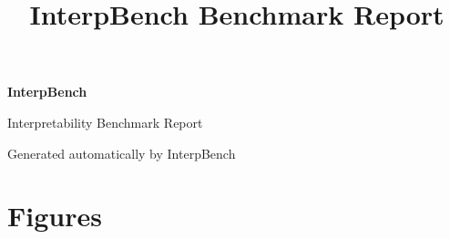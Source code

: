 \documentclass[11pt,a4paper]{article}
\title{
    \vspace{-2cm}
    \textbf{InterpBench Benchmark Report}
}
\author{}
\date{}
\begin{document}

\begin{titlepage}

\thispagestyle{empty}

\centering

\vspace*{2cm}

{\Huge
\textbf{InterpBench}
}

\vspace{0.5cm}

{\Large
Interpretability Benchmark Report
}

\vspace{2cm}




\vfill

Generated automatically by InterpBench

\vspace{0.5cm}

\DTMnow

\end{titlepage}








\pagestyle{fancy}

\newpage

\section{Figures}




\end{document}
